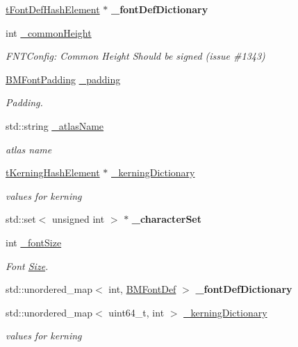 \begin{DoxyCompactItemize}
\item 
\hyperlink{struct__FontDefHashElement}{t\+Font\+Def\+Hash\+Element} $\ast$ {\bfseries \+\_\+font\+Def\+Dictionary}
\item 
int \hyperlink{group__label_ga6409fa4f816ee11ee9f6d8ae836969aa}{\+\_\+common\+Height}
\begin{DoxyCompactList}\small\item\em F\+N\+T\+Config\+: Common Height Should be signed (issue \#1343) \end{DoxyCompactList}\item 
\hyperlink{structBMFontPadding}{B\+M\+Font\+Padding} \hyperlink{group__label_gac9bca22b336c401f9446dae89679e646}{\+\_\+padding}
\begin{DoxyCompactList}\small\item\em Padding. \end{DoxyCompactList}\item 
std\+::string \hyperlink{group__label_ga3ad769d94dce120f39c8f502bdbac2ad}{\+\_\+atlas\+Name}
\begin{DoxyCompactList}\small\item\em atlas name \end{DoxyCompactList}\item 
\hyperlink{struct__KerningHashElement}{t\+Kerning\+Hash\+Element} $\ast$ \hyperlink{group__label_ga246c499bd161998ce4382f474e9be832}{\+\_\+kerning\+Dictionary}
\begin{DoxyCompactList}\small\item\em values for kerning \end{DoxyCompactList}\item 
std\+::set$<$ unsigned int $>$ $\ast$ {\bfseries \+\_\+character\+Set}
\item 
int \hyperlink{group__label_gacffa3f4764fb2fa613d1276210819c14}{\+\_\+font\+Size}
\begin{DoxyCompactList}\small\item\em Font \hyperlink{classSize}{Size}. \end{DoxyCompactList}\item 
std\+::unordered\+\_\+map$<$ int, \hyperlink{structBMFontDef}{B\+M\+Font\+Def} $>$ {\bfseries \+\_\+font\+Def\+Dictionary}
\item 
std\+::unordered\+\_\+map$<$ uint64\+\_\+t, int $>$ \hyperlink{group__label_gaaf96511ac7124077592700eee5f504d0}{\+\_\+kerning\+Dictionary}
\begin{DoxyCompactList}\small\item\em values for kerning \end{DoxyCompactList}\end{DoxyCompactItemize}
